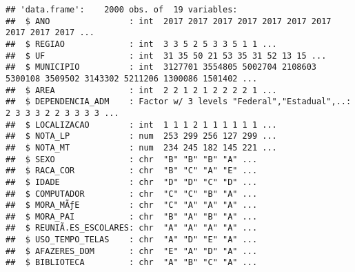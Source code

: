 \documentclass[
]{article}
\newenvironment{Shaded}{\begin{snugshade}}{\end{snugshade}}
\newcommand{\AttributeTok}[1]{\textcolor[rgb]{0.77,0.63,0.00}{#1}}
\newcommand{\CommentTok}[1]{\textcolor[rgb]{0.56,0.35,0.01}{\textit{#1}}}
\newcommand{\ConstantTok}[1]{\textcolor[rgb]{0.00,0.00,0.00}{#1}}
\newcommand{\ControlFlowTok}[1]{\textcolor[rgb]{0.13,0.29,0.53}{\textbf{#1}}}
\newcommand{\DecValTok}[1]{\textcolor[rgb]{0.00,0.00,0.81}{#1}}
\newcommand{\FunctionTok}[1]{\textcolor[rgb]{0.00,0.00,0.00}{#1}}
\newcommand{\NormalTok}[1]{#1}
\newcommand{\OtherTok}[1]{\textcolor[rgb]{0.56,0.35,0.01}{#1}}
\newcommand{\SpecialCharTok}[1]{\textcolor[rgb]{0.00,0.00,0.00}{#1}}
\newcommand{\StringTok}[1]{\textcolor[rgb]{0.31,0.60,0.02}{#1}}
\begin{document}
\begin{verbatim}
## 'data.frame':    2000 obs. of  19 variables:
##  $ ANO                : int  2017 2017 2017 2017 2017 2017 2017 2017 2017 2017 ...
##  $ REGIAO             : int  3 3 5 2 5 3 3 5 1 1 ...
##  $ UF                 : int  31 35 50 21 53 35 31 52 13 15 ...
##  $ MUNICIPIO          : int  3127701 3554805 5002704 2108603 5300108 3509502 3143302 5211206 1300086 1501402 ...
##  $ AREA               : int  2 2 1 2 1 2 2 2 2 1 ...
##  $ DEPENDENCIA_ADM    : Factor w/ 3 levels "Federal","Estadual",..: 2 3 3 3 2 2 3 3 3 3 ...
##  $ LOCALIZACAO        : int  1 1 1 2 1 1 1 1 1 1 ...
##  $ NOTA_LP            : num  253 299 256 127 299 ...
##  $ NOTA_MT            : num  234 245 182 145 221 ...
##  $ SEXO               : chr  "B" "B" "B" "A" ...
##  $ RACA_COR           : chr  "B" "C" "A" "E" ...
##  $ IDADE              : chr  "D" "D" "C" "D" ...
##  $ COMPUTADOR         : chr  "C" "C" "B" "A" ...
##  $ MORA_MÃƒE          : chr  "C" "A" "A" "A" ...
##  $ MORA_PAI           : chr  "B" "A" "B" "A" ...
##  $ REUNIÃ.ES_ESCOLARES: chr  "A" "A" "A" "A" ...
##  $ USO_TEMPO_TELAS    : chr  "A" "D" "E" "A" ...
##  $ AFAZERES_DOM       : chr  "E" "A" "D" "A" ...
##  $ BIBLIOTECA         : chr  "A" "B" "C" "A" ...
\end{verbatim}

\begin{Shaded}
\end{Shaded}
\end{document}
